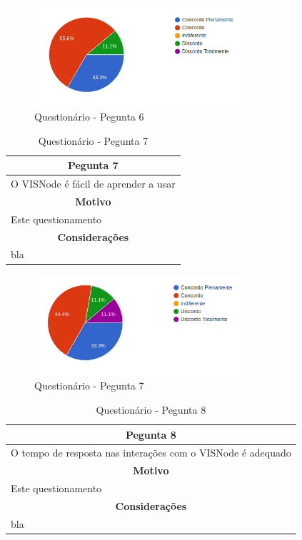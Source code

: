 \documentclass[
	12pt,				%
	oneside,			%
	a4paper,			%
	english,			%
	french,				%
	spanish,			%
	brazil,				%
	]{abntex2}
\begin{document}
\begin{figure}[H]
\centering
\caption{Questionário - Pegunta 6}
\includegraphics[width=0.7\textwidth]{imagens/v1/p6.png}
\sourceAuthor
\end{figure}

\begin{table}[H]
\centering
\caption{Questionário - Pegunta 7} 
\def\arraystretch{1.5}
\begin{tabular}{l}
\hline
\multicolumn{1}{c}{\textbf{Pegunta 7}}              \\ \hline
O VISNode é fácil de aprender a usar          \\ \hline
\multicolumn{1}{c}{\textbf{Motivo}}                 \\ \hline
Este questionamento                                   \\ \hline
\multicolumn{1}{c}{\textbf{Considerações}}          \\ \hline
bla                                                   \\ \hline
\end{tabular}
\sourceAuthor
\end{table}

\begin{figure}[H]
\centering
\caption{Questionário - Pegunta 7}
\includegraphics[width=0.7\textwidth]{imagens/v1/p7.png}
\sourceAuthor
\end{figure}

\begin{table}[H]
\centering
\caption{Questionário - Pegunta 8} 
\def\arraystretch{1.5}
\begin{tabular}{l}
\hline
\multicolumn{1}{c}{\textbf{Pegunta 8}}              \\ \hline
O tempo de resposta nas interações com o VISNode é adequado \\ \hline
\multicolumn{1}{c}{\textbf{Motivo}}                 \\ \hline
Este questionamento                                   \\ \hline
\multicolumn{1}{c}{\textbf{Considerações}}          \\ \hline
bla                                                   \\ \hline
\end{tabular}
\sourceAuthor
\end{table}
\end{document}

